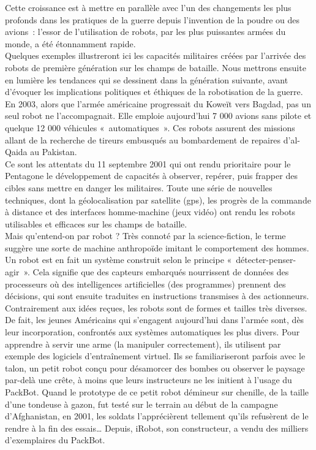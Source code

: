 \documentclass[8pt]{article}
\begin{document}
Cette croissance est à mettre en parallèle avec l’un des changements les plus profonds dans les pratiques de la guerre depuis l’invention de la poudre ou des avions~: l’essor de l’utilisation de robots, par les plus puissantes armées du monde, a été étonnamment rapide.\\

Quelques exemples illustreront ici les capacités militaires créées par l’arrivée des robots de première génération sur les champs de bataille. Nous mettrons ensuite en lumière les tendances qui se dessinent dans la génération suivante, avant d’évoquer les implications politiques et éthiques de la robotisation de la guerre.\\

En 2003, alors que l’armée américaine progressait du Koweït vers Bagdad, pas un seul robot ne l’accompagnait. Elle emploie aujourd’hui 7 000 avions sans pilote et quelque 12 000 véhicules «~automatiques~». Ces robots assurent des missions allant de la recherche de tireurs embusqués au bombardement de repaires d’al-Qaida au Pakistan.\\

Ce sont les attentats du 11 septembre 2001 qui ont rendu prioritaire pour le Pentagone le développement de capacités à observer, repérer, puis frapper des cibles sans mettre en danger les militaires. Toute une série de nouvelles techniques, dont la géolocalisation par satellite (gps), les progrès de la commande à distance et des interfaces homme-machine (jeux vidéo) ont rendu les robots utilisables et efficaces sur les champs de bataille.\\

Mais qu’entend-on par robot ? Très connoté par la science-fiction, le terme suggère une sorte de machine anthropoïde imitant le comportement des hommes. Un robot est en fait un système construit selon le principe «~détecter-penser-agir~». Cela signifie que des capteurs embarqués nourrissent de données des processeurs où des intelligences artificielles (des programmes) prennent des décisions, qui sont ensuite traduites en instructions transmises à des actionneurs. Contrairement aux idées reçues, les robots sont de formes et tailles très diverses.\\

De fait, les jeunes Américains qui s’engagent aujourd’hui dans l’armée sont, dès leur incorporation, confrontés aux systèmes automatiques les plus divers. Pour apprendre à servir une arme (la manipuler correctement), ils utilisent par exemple des logiciels d’entraînement virtuel. Ils se familiariseront parfois avec le talon, un petit robot conçu pour désamorcer des bombes ou observer le paysage par-delà une crête, à moins que leurs instructeurs ne les initient à l’usage du PackBot. Quand le prototype de ce petit robot démineur sur chenille, de la taille d’une tondeuse à gazon, fut testé sur le terrain au début de la campagne d’Afghanistan, en 2001, les soldats l’apprécièrent tellement qu’ils refusèrent de le rendre à la fin des essais… Depuis, iRobot, son constructeur, a vendu des milliers d’exemplaires du PackBot.\\
\end{document}

